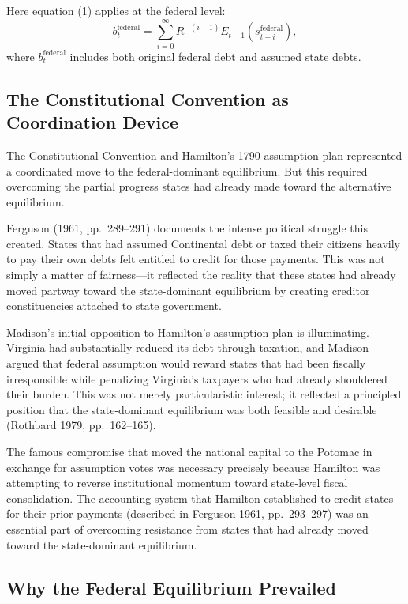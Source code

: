 \documentclass[12pt]{article}
\begin{document}
Here equation (1) applies at the federal level:
\begin{equation}
b_t^{\text{federal}} = \sum_{i=0}^{\infty} R^{-(i+1)} E_{t-1}(s_{t+i}^{\text{federal}}),
\end{equation}
where $b_t^{\text{federal}}$ includes both original federal debt and assumed state debts.

\subsection{The Constitutional Convention as Coordination Device}

The Constitutional Convention and Hamilton's 1790 assumption plan represented a coordinated move to the federal-dominant equilibrium. But this required overcoming the partial progress states had already made toward the alternative equilibrium. 

Ferguson (1961, pp.~289--291) documents the intense political struggle this created. States that had assumed Continental debt or taxed their citizens heavily to pay their own debts felt entitled to credit for those payments. This was not simply a matter of fairness---it reflected the reality that these states had already moved partway toward the state-dominant equilibrium by creating creditor constituencies attached to state government.

Madison's initial opposition to Hamilton's assumption plan is illuminating. Virginia had substantially reduced its debt through taxation, and Madison argued that federal assumption would reward states that had been fiscally irresponsible while penalizing Virginia's taxpayers who had already shouldered their burden. This was not merely particularistic interest; it reflected a principled position that the state-dominant equilibrium was both feasible and desirable (Rothbard 1979, pp.~162--165).

The famous compromise that moved the national capital to the Potomac in exchange for assumption votes was necessary precisely because Hamilton was attempting to reverse institutional momentum toward state-level fiscal consolidation. The accounting system that Hamilton established to credit states for their prior payments (described in Ferguson 1961, pp.~293--297) was an essential part of overcoming resistance from states that had already moved toward the state-dominant equilibrium.

\subsection{Why the Federal Equilibrium Prevailed}
\end{document}
